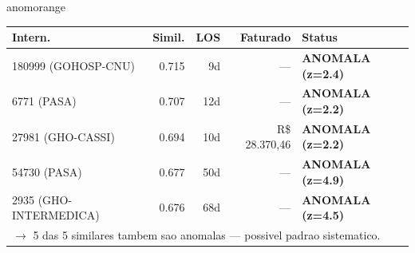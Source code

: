 \documentclass[a4paper,10pt]{article}
\begin{document}
\begin{anomalycard}[Internacao 162348 | GHO-PETROBRAS | ALTO (z=3.72)]{anomorange}
\begin{tabular}{l r r r l}\toprule\textbf{Intern.} & \textbf{Simil.} & \textbf{LOS} & \textbf{Faturado} & \textbf{Status} \\\midrule
180999 (GOHOSP-CNU) & 0.715 & 9d & --- & \textcolor{anomred}{\textbf{ANOMALA (z=2.4)}} \\
6771 (PASA) & 0.707 & 12d & --- & \textcolor{anomred}{\textbf{ANOMALA (z=2.2)}} \\
27981 (GHO-CASSI) & 0.694 & 10d & R\$ 28.370,46 & \textcolor{anomred}{\textbf{ANOMALA (z=2.2)}} \\
54730 (PASA) & 0.677 & 50d & --- & \textcolor{anomred}{\textbf{ANOMALA (z=4.9)}} \\
2935 (GHO-INTERMEDICA) & 0.676 & 68d & --- & \textcolor{anomred}{\textbf{ANOMALA (z=4.5)}} \\
\multicolumn{5}{l}{\textcolor{anomred}{\small $\rightarrow$ 5 das 5 similares tambem sao anomalas --- possivel padrao sistematico.}} \\
\bottomrule\end{tabular}



\end{anomalycard}

\newpage
\end{document}
